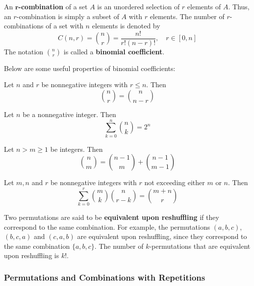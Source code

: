 \begin{definition}[$r$-Combination]
    An \textbf{$\bm{r}$-combination} of a set $A$ is an unordered selection of $r$ elements of $A$.
    Thus, an $r$-combination is simply a subset of $A$ with $r$ elements. The number of
    $r$-combinations of a set with $n$ elements is denoted by
    \[
        C(n,r) = \binom{n}{r} = \frac{n!}{r!(n-r)!},\quad r\in[0,n]
    \]
    The notation $\binom{n}{r}$ is called a \textbf{binomial coefficient}.
\end{definition}

Below are some useful properties of binomial coefficients:

\begin{corollary}
    Let $n$ and $r$ be nonnegative integers with $r \leq n$. Then
    \[
        \binom{n}{r} = \binom{n}{n-r}
    \]
\end{corollary}

\begin{corollary}
    Let $n$ be a nonnegative integer. Then
    \[
        \sum_{k=0}^n \binom{n}{k} = 2^n
    \]
\end{corollary}

\begin{corollary}
    Let $n>m\geq 1$ be integers. Then
    \[
        \binom{n}{m} = \binom{n-1}{m} + \binom{n-1}{m-1}
    \]
\end{corollary}

\begin{theorem}
    Let $m,n$ and $r$ be nonnegative integers with $r$ not exceeding either $m$ or $n$. Then
    \[
        \sum_{k=0}^r \binom{m}{k} \binom{n}{r-k} = \binom{m+n}{r}
    \]
\end{theorem}

\begin{definition}
    Two permutations are said to be \textbf{equivalent upon reshuffling} if they correspond
    to the same combination. For example, the permutations $(a,b,c)$, $(b,c,a)$ and $(c,a,b)$
    are equivalent upon reshuffling, since they correspond to the same combination $\{a,b,c\}$.
    The number of $k$-permutations that are equivalent upon reshuffling is $k!$.
\end{definition}

\subsubsection{Permutations and Combinations with Repetitions}

